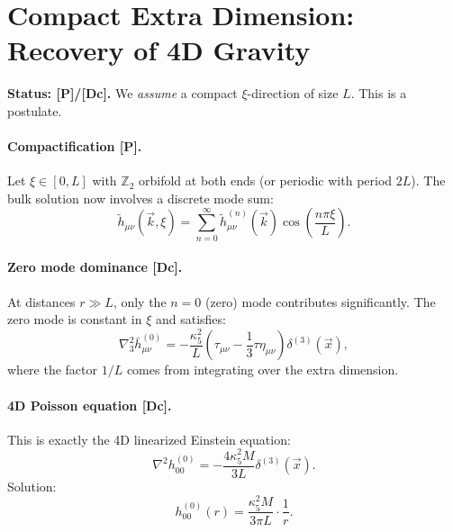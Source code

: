 \documentclass[11pt,a4paper]{article}
\newcommand{\tagP}{\textcolor{orange!80!black}{[P]}}
\newcommand{\tagDc}{\textcolor{purple!70!black}{[Dc]}}
\begin{document}
\section{Compact Extra Dimension: Recovery of 4D Gravity}
\label{sec:compact}

\begin{statusbox}
\textbf{Status: \tagP{}/\tagDc{}.}
We \emph{assume} a compact $\xi$-direction of size $L$. This is a postulate.
\end{statusbox}

\paragraph{Compactification \tagP{}.}
Let $\xi \in [0, L]$ with $\mathbb{Z}_2$ orbifold at both ends (or periodic with period $2L$).
The bulk solution now involves a discrete mode sum:
\begin{equation}
    \tilde{h}_{\mu\nu}(\vec{k}, \xi) = \sum_{n=0}^\infty \tilde{h}_{\mu\nu}^{(n)}(\vec{k}) \cos\left(\frac{n\pi\xi}{L}\right).
\end{equation}

\paragraph{Zero mode dominance \tagDc{}.}
At distances $r \gg L$, only the $n=0$ (zero) mode contributes significantly.
The zero mode is constant in $\xi$ and satisfies:
\begin{equation}
    \nabla^2_3 \bar{h}_{\mu\nu}^{(0)} = -\frac{\kappa_5^2}{L} \left( \tau_{\mu\nu} - \frac{1}{3}\tau\eta_{\mu\nu} \right) \delta^{(3)}(\vec{x}),
\end{equation}
where the factor $1/L$ comes from integrating over the extra dimension.

\paragraph{4D Poisson equation \tagDc{}.}
This is exactly the 4D linearized Einstein equation:
\begin{equation}
    \nabla^2 h_{00}^{(0)} = -\frac{4\kappa_5^2 M}{3L} \delta^{(3)}(\vec{x}).
\end{equation}
Solution:
\begin{equation}
    h_{00}^{(0)}(r) = \frac{\kappa_5^2 M}{3\pi L} \cdot \frac{1}{r}.
    \label{eq:h00_4D}
\end{equation}
\end{document}
